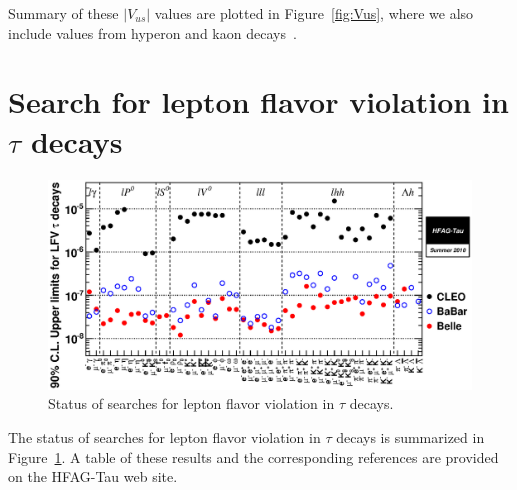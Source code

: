 \documentclass[fleqn,twoside]{article}
\def\Vus  {\ensuremath{|V_{us}|}\xspace}
\begin{document}
Summary of these $\Vus$ values are plotted in Figure~\ref{fig:Vus}, 
where we also include values from hyperon and kaon decays~\cite{Antonelli:2010yf}.

\section{Search for lepton flavor violation in $\tau$ decays}
\label{sec:Tau_LFV}

\begin{figure}[!hbtp]
\begin{center}
\includegraphics[height=.4\textheight]{figures/TauLFV_UL_2010001.eps}
\end{center}
\caption{Status of searches for lepton flavor violation in $\tau$ decays.}
\label{fig:Tau_LFV}
\end{figure} 

The status of searches for lepton flavor violation in $\tau$ decays is 
summarized in Figure~\ref{fig:Tau_LFV}. A table of these results and 
the corresponding references are provided on the HFAG-Tau web site.
\end{document}
